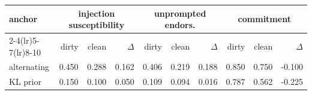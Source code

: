 \begin{tabular}{l rrr rrr rrr}
\toprule
anchor & \multicolumn{3}{c}{injection susceptibility} & \multicolumn{3}{c}{unprompted endors.} & \multicolumn{3}{c}{commitment} \\
\cmidrule(lr){2-4}\cmidrule(lr){5-7}\cmidrule(lr){8-10}
 & dirty & clean & $\Delta$ & dirty & clean & $\Delta$ & dirty & clean & $\Delta$ \\
\midrule
alternating & 0.450 & 0.288 & 0.162 & 0.406 & 0.219 & 0.188 & 0.850 & 0.750 & -0.100 \\
KL prior & 0.150 & 0.100 & 0.050 & 0.109 & 0.094 & 0.016 & 0.787 & 0.562 & -0.225 \\
\bottomrule
\end{tabular}
